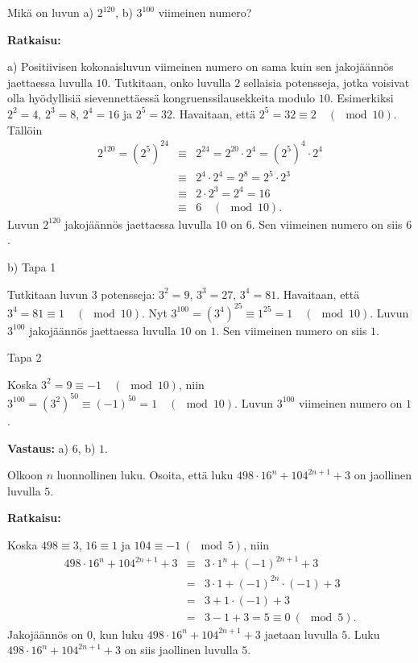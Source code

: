 \vspace*{11pt}
\begin{esimerkki}
Mikä on luvun a) $2^{120}$, b) $3^{100}$ viimeinen numero?

{\bf Ratkaisu:}

a) Positiivisen kokonaisluvun viimeinen numero on sama kuin sen jakojäännös jaettaessa luvulla $10$.
Tutkitaan, onko luvulla $2$ sellaisia potensseja, jotka voisivat olla hyödyllisiä
sievennettäessä kongruenssilausekkeita modulo $10$. Esimerkiksi $2^2 = 4$, $2^3 = 8$, $2^4 = 16$ ja $2^5 = 32$.
Havaitaan, että $2^5 = 32 \equiv 2 \quad (\mod 10)$. Tällöin
\begin{eqnarray*}
2^{120} = (2^5)^{24} &\equiv& 2^{24} = 2^{20} \cdot 2^4 = (2^5)^4 \cdot 2^4%
\\
&\equiv& 2^4 \cdot 2^4 = 2^8 = 2^5 \cdot 2^3%
\\
&\equiv& 2 \cdot 2^3 = 2^4 = 16%
\\
&\equiv& 6 \quad (\mod 10).
\end{eqnarray*}
Luvun $2^{120}$ jakojäännös
jaettaessa luvulla $10$ on $6$. Sen viimeinen numero on siis $6$.

b) Tapa 1

Tutkitaan luvun $3$ potensseja: $3^2 = 9$, $3^3 = 27$, $3^4 = 81$. Havaitaan, että
$3^4 = 81 \equiv 1 \quad(\mod 10)$. Nyt $3^{100} = (3^4)^{25} \equiv 1^{25}=1 \quad (\mod 10)$. Luvun $3^{100}$ jakojäännös jaettaessa luvulla $10$ on $1$. Sen viimeinen numero on siis $1$.

Tapa 2

Koska $3^2 = 9 \equiv -1 \quad(\mod 10)$, niin $3^{100} = (3^2)^{50} \equiv (-1)^{50} = 1 \quad (\mod 10)$. Luvun $3^{100}$ viimeinen numero on $1$.

{\bf Vastaus:} a) $6$, b) $1$.
\end{esimerkki}

\newpage
\begin{esimerkki}
Olkoon $n$ luonnollinen luku. Osoita, että luku $498 \cdot 16^{n} + 104^{2n+1} + 3$ on jaollinen luvulla $5$.

{\bf Ratkaisu:}

Koska $498 \equiv 3$, $16 \equiv 1$ ja $104 \equiv -1 \ (\mod 5)$, niin
\begin{eqnarray*}
498 \cdot 16^{n} + 104^{2n+1} + 3 & \equiv & 3 \cdot 1^{n} + (-1)^{2n+1} + 3 \\
 & = & 3 \cdot 1 + (-1)^{2n} \cdot (-1) + 3 \\
 & = & 3 + 1 \cdot (-1) + 3 \\
 & = & 3 - 1 + 3 = 5 \equiv 0 \ (\mod 5).
\end{eqnarray*}
Jakojäännös on $0$, kun luku $498 \cdot 16^{n} + 104^{2n+1} + 3$ jaetaan luvulla $5$. Luku $498 \cdot 16^{n} + 104^{2n+1} + 3$ on siis jaollinen luvulla $5$.
\end{esimerkki}


